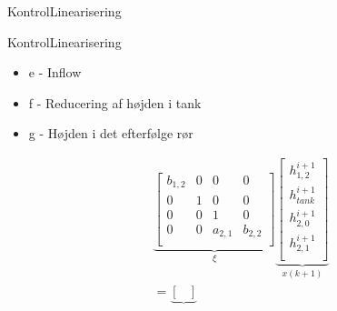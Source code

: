 \begin{frame}{Kontrol}{Linearisering}
\end{frame}
\begin{frame}{Kontrol}{Linearisering}
\begin{itemize}
	\item e - Inflow
	\item f - Reducering af højden i tank
	\item g - Højden i det efterfølge rør
\end{itemize}
\begin{equation}\label{eq:tank_linear_implement_ss}
\begin{aligned}
      & \underbrace{\begin{bmatrix}
            b_{1,2}   & 0         &0          &0 \\ %
            0         & 1         & 0         &0     \\ %
             0         &  0        & 1         &0  \\ %
            0          &  0         &a_{2,1}    &  b_{2,2}\\ %
       \end{bmatrix}}_{\xi}
        \underbrace{\begin{bmatrix}
        h_{1,2}^{i+1} \\ 
        h_{tank}^{i+1} \\          
        h_{2,0}^{i+1}     \\
        h_{2,1}^{i+1}\\
    \end{bmatrix}}_{x(k+1)}
    \\ &=
    \underbrace{\begin{bmatrix}

\end{bmatrix}}
\end{aligned}
\end{equation}
\end{frame}
